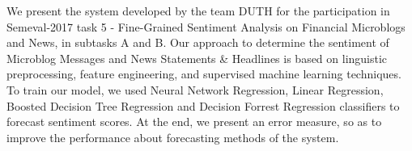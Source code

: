 We present the system developed by the team DUTH for the participation in Semeval-2017 task 5 - Fine-Grained Sentiment Analysis on Financial Microblogs and News, in subtasks A and B. Our approach to determine the sentiment of Microblog Messages and News Statements \& Headlines is based on linguistic preprocessing, feature engineering, and supervised machine learning techniques. To train our model, we used Neural Network Regression, Linear Regression, Boosted Decision Tree Regression and Decision Forrest Regression classifiers to forecast sentiment scores. At the end, we present an error measure, so as to improve the performance about forecasting methods of the system.
